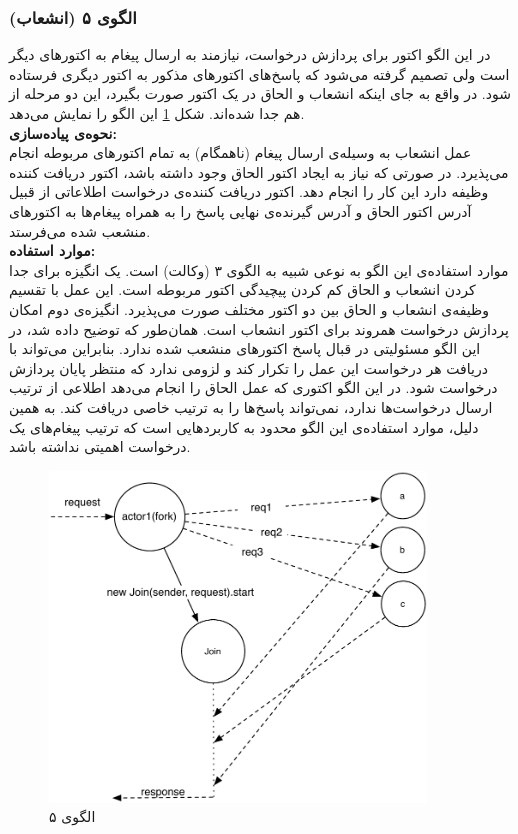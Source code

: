 \subsubsection{الگوی ۵ (انشعاب)}
در این الگو اکتور برای پردازش درخواست، نیازمند به ارسال پیغام به اکتورهای دیگر است ولی تصمیم گرفته می‌شود که پاسخ‌های اکتورهای مذکور به اکتور دیگری فرستاده شود. در واقع به جای اینکه انشعاب و الحاق در یک اکتور صورت بگیرد، این دو مرحله از هم جدا شده‌اند. شکل \ref{fig:Patterns_stateless_fj} این الگو را نمایش می‌دهد.\\
\textbf{نحوه‌ی پیاده‌سازی:}\\
عمل انشعاب به وسیله‌ی ارسال پیغام (ناهمگام) به تمام اکتورهای مربوطه انجام می‌پذیرد. در صورتی که نیاز به ایجاد اکتور الحاق وجود داشته باشد، اکتور دریافت کننده وظیفه دارد این کار را انجام دهد. اکتور دریافت کننده‌ی درخواست اطلاعاتی از قبیل آدرس اکتور الحاق و آدرس گیرنده‌ی نهایی پاسخ را به همراه پیغام‌ها به اکتورهای منشعب شده می‌فرستد.\\
\textbf{موارد استفاده:}\\
موارد استفاده‌ی این الگو به نوعی شبیه به الگوی ۳ (وکالت) است. یک انگیزه برای جدا کردن انشعاب و الحاق کم کردن پیچیدگی اکتور مربوطه است. این عمل با تقسیم وظیفه‌ی انشعاب و الحاق بین دو اکتور مختلف صورت می‌پذیرد. انگیزه‌ی دوم امکان پردازش درخواست همروند برای اکتور انشعاب است. همان‌طور که توضیح داده شد، در این الگو مسئولیتی در قبال پاسخ اکتورهای منشعب شده ندارد. بنابراین می‌تواند با دریافت هر درخواست این عمل را تکرار کند و لزومی ندارد که منتظر پایان پردازش درخواست شود. در این الگو اکتوری که عمل الحاق را انجام می‌دهد اطلاعی از ترتیب ارسال درخواست‌ها ندارد، نمی‌تواند پاسخ‌ها را به ترتیب خاصی دریافت کند. به همین دلیل، موارد استفاده‌ی این الگو محدود به کاربردهایی است که ترتیب پیغام‌های یک درخواست اهمیتی نداشته باشد.
\begin{figure}[hb]
    \begin{center}
	\includegraphics[width=10cm]{4-ProposedFramework/Figures/Patterns_stateless_fj.pdf}
    \end{center}
    \caption{\label{fig:Patterns_stateless_fj}الگوی ۵}
\end{figure}

